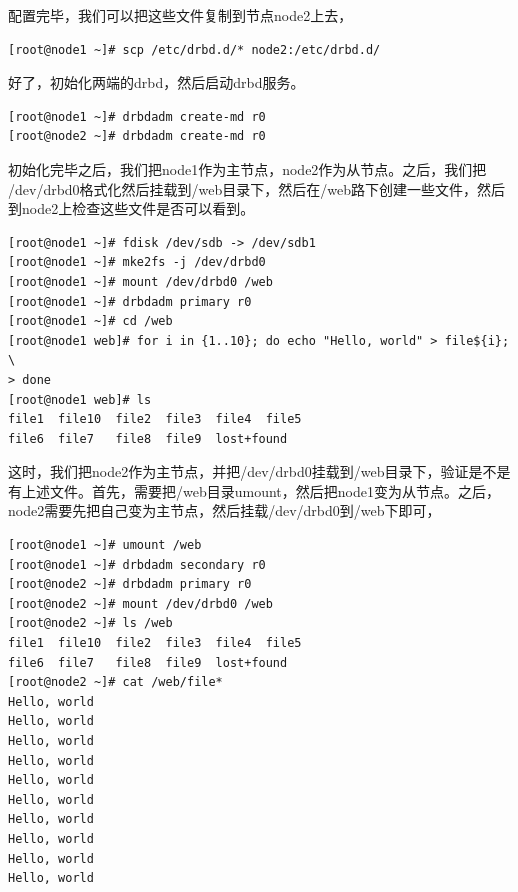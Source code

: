 配置完毕，我们可以把这些文件复制到节点node2上去，

\small{
\begin{verbatim}
[root@node1 ~]# scp /etc/drbd.d/* node2:/etc/drbd.d/
\end{verbatim}
}
\normalsize

好了，初始化两端的drbd，然后启动drbd服务。

\small{
\begin{verbatim}
[root@node1 ~]# drbdadm create-md r0
[root@node2 ~]# drbdadm create-md r0
\end{verbatim}
}
\normalsize

初始化完毕之后，我们把node1作为主节点，node2作为从节点。之后，我们把
/dev/drbd0格式化然后挂载到/web目录下，然后在/web路下创建一些文件，然后
到node2上检查这些文件是否可以看到。

\small{
\begin{verbatim}
[root@node1 ~]# fdisk /dev/sdb -> /dev/sdb1
[root@node1 ~]# mke2fs -j /dev/drbd0
[root@node1 ~]# mount /dev/drbd0 /web
[root@node1 ~]# drbdadm primary r0
[root@node1 ~]# cd /web
[root@node1 web]# for i in {1..10}; do echo "Hello, world" > file${i}; \
> done
[root@node1 web]# ls
file1  file10  file2  file3  file4  file5  
file6  file7   file8  file9  lost+found
\end{verbatim}
}
\normalsize

这时，我们把node2作为主节点，并把/dev/drbd0挂载到/web目录下，验证是不是
有上述文件。首先，需要把/web目录umount，然后把node1变为从节点。之后，
node2需要先把自己变为主节点，然后挂载/dev/drbd0到/web下即可，

\small{
\begin{verbatim}
[root@node1 ~]# umount /web
[root@node1 ~]# drbdadm secondary r0
[root@node2 ~]# drbdadm primary r0
[root@node2 ~]# mount /dev/drbd0 /web
[root@node2 ~]# ls /web
file1  file10  file2  file3  file4  file5  
file6  file7   file8  file9  lost+found
[root@node2 ~]# cat /web/file*
Hello, world
Hello, world
Hello, world
Hello, world
Hello, world
Hello, world
Hello, world
Hello, world
Hello, world
Hello, world
\end{verbatim}
}
\normalsize


